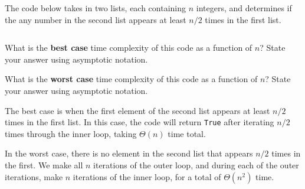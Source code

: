 \begin{prob}[(2 points)]
    The code below takes in two lists, each containing $n$ integers, and
    determines if the any number in the second list appears at least $n/2$
    times in the first list.

    \inputminted[lastline=12]{python}{code.py}

    \begin{subprobset}

        \begin{subprob}
            What is the \textbf{best case} time complexity of this code as a function of $n$?
            State your answer using asymptotic notation.


        \end{subprob}

        \begin{subprob}

            What is the \textbf{worst case} time complexity of this code as a function of $n$?
            State your answer using asymptotic notation.


        \end{subprob}

    \end{subprobset}

    \begin{soln}
        The best case is when the first element of the second list appears at least $n/2$ times
        in the first list. In this case, the code will return \texttt{True} after iterating $n/2$ times
        through the inner loop, taking $\Theta(n)$ time total.

        In the worst case, there is no element in the second list that appears
        $n/2$ times in the first. We make all $n$ iterations of the outer loop,
        and during each of the outer iterations, make $n$ iterations of the
        inner loop, for a total of $\Theta(n^2)$ time.
    \end{soln}

\end{prob}
